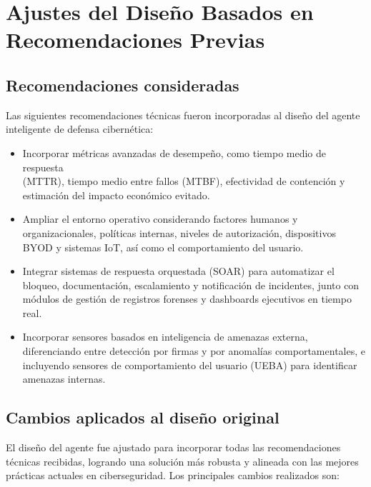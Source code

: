 \documentclass[letterpaper, 12pt]{report}
\begin{document}
\section{Ajustes del Diseño Basados en Recomendaciones Previas}

\subsection{Recomendaciones consideradas}
Las siguientes recomendaciones técnicas fueron incorporadas al diseño del
agente inteligente de defensa cibernética:

\begin{itemize}
      \item Incorporar métricas avanzadas de desempeño, como tiempo medio de respuesta \\
            (MTTR), tiempo medio entre fallos (MTBF), efectividad de contención y
            estimación del impacto económico evitado.
      \item Ampliar el entorno operativo considerando factores humanos y organizacionales,
            políticas internas, niveles de autorización, dispositivos BYOD y sistemas IoT,
            así como el comportamiento del usuario.
      \item Integrar sistemas de respuesta orquestada (SOAR) para automatizar el bloqueo,
            documentación, escalamiento y notificación de incidentes, junto con módulos de
            gestión de registros forenses y dashboards ejecutivos en tiempo real.
      \item Incorporar sensores basados en inteligencia de amenazas externa, diferenciando
            entre detección por firmas y por anomalías comportamentales, e incluyendo
            sensores de comportamiento del usuario (UEBA) para identificar amenazas
            internas.
\end{itemize}

\subsection{Cambios aplicados al diseño original}

El diseño del agente fue ajustado para incorporar todas las recomendaciones
técnicas recibidas, logrando una solución más robusta y alineada con las
mejores prácticas actuales en ciberseguridad. Los principales cambios
realizados son:
\end{document}

